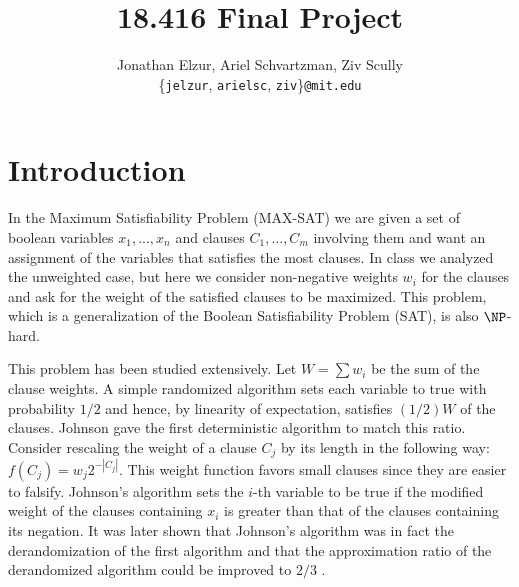 \documentclass[11pt,letter]{article}
\begin{document}


\title{18.416 Final Project}

\author{Jonathan Elzur, Ariel Schvartzman, Ziv Scully \\
  \{\texttt{jelzur}, \texttt{arielsc}, \texttt{ziv}\}\texttt{@mit.edu}}

\maketitle


\section{Introduction}

In the Maximum Satisfiability Problem (MAX-SAT) we are given a set of boolean variables $x_1, ..., x_n$
and clauses $C_1,...,C_m$ involving them and want an assignment of the variables that satisfies the most clauses.
In class we analyzed the unweighted case, but here we consider non-negative weights $w_i$ for the clauses
and ask for the weight of the satisfied clauses to be maximized. This problem, which is a generalization of the
Boolean Satisfiability Problem (SAT), is also $\NP$-hard.

This problem has been studied extensively. Let $W = \sum w_i$ be the sum of the clause weights.
A simple randomized algorithm sets each variable to true with probability $1/2$ and hence,
by linearity of expectation, satisfies $(1/2)W$ of the clauses. Johnson \cite{Johnson1974256}
gave the first deterministic algorithm to match this ratio. Consider rescaling the weight of a clause $C_j$
by its length in the following way: $f(C_j) = w_j 2^{-|C_j|}$. This weight function favors small clauses
since they are easier to falsify. Johnson's algorithm sets the $i$-th variable to be true
if the modified weight of the clauses containing $x_i$ is greater than that of the clauses containing its negation.
It was later shown that Johnson's algorithm was in fact the derandomization of the first algorithm and that the
approximation ratio of the derandomized algorithm could be improved to $2/3$ \cite{Chen1999622}.
\end{document}
